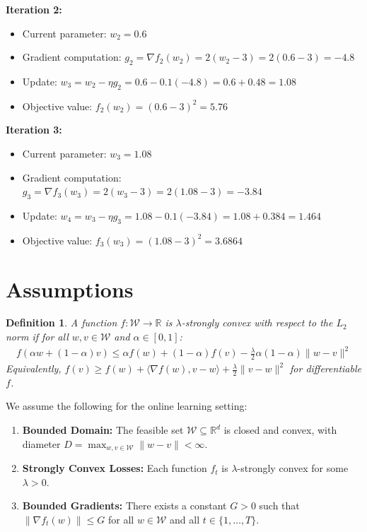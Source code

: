 \documentclass{article}
\newtheorem{definition}[theorem]{Definition}
\begin{document}
\textbf{Iteration 2:}
\begin{itemize}
\item Current parameter: $w_2 = 0.6$
\item Gradient computation: $g_2 = \nabla f_2(w_2) = 2(w_2 - 3) = 2(0.6 - 3) = -4.8$
\item Update: $w_3 = w_2 - \eta g_2 = 0.6 - 0.1(-4.8) = 0.6 + 0.48 = 1.08$
\item Objective value: $f_2(w_2) = (0.6-3)^2 = 5.76$
\end{itemize}

\textbf{Iteration 3:}
\begin{itemize}
\item Current parameter: $w_3 = 1.08$
\item Gradient computation: $g_3 = \nabla f_3(w_3) = 2(w_3 - 3) = 2(1.08 - 3) = -3.84$
\item Update: $w_4 = w_3 - \eta g_3 = 1.08 - 0.1(-3.84) = 1.08 + 0.384 = 1.464$
\item Objective value: $f_3(w_3) = (1.08-3)^2 = 3.6864$
\end{itemize}

\section*{Assumptions}
\begin{definition}
A function $f : \mathcal{W} \to \mathbb{R}$ is $\lambda$-strongly convex with respect to the $L_2$ norm if for all $w, v \in \mathcal{W}$ and $\alpha \in [0,1]$:
\begin{align*}
f(\alpha w + (1-\alpha)v) \leq \alpha f(w) + (1-\alpha) f(v) - \frac{\lambda}{2} \alpha(1-\alpha) \|w-v\|^2
\end{align*}
Equivalently, $f(v) \geq f(w) + \langle \nabla f(w), v - w \rangle + \frac{\lambda}{2} \|v - w\|^2$ for differentiable $f$.
\end{definition}

We assume the following for the online learning setting:
\begin{enumerate}
\item \textbf{Bounded Domain:} The feasible set $\mathcal{W} \subseteq \mathbb{R}^d$ is closed and convex, with diameter $D = \max_{w, v \in \mathcal{W}} \|w - v\| < \infty$.
\item \textbf{Strongly Convex Losses:} Each function $f_t$ is $\lambda$-strongly convex for some $\lambda > 0$.
\item \textbf{Bounded Gradients:} There exists a constant $G > 0$ such that $\|\nabla f_t(w)\| \leq G$ for all $w \in \mathcal{W}$ and all $t \in \{1, \dots, T\}$.
\end{enumerate}
\end{document}
